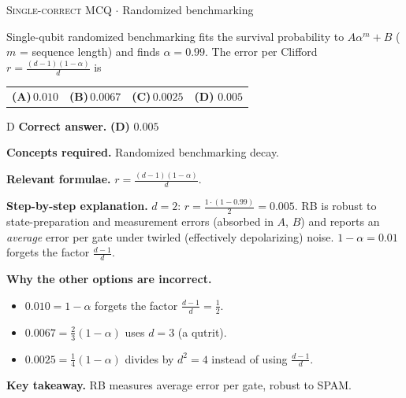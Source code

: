 \documentclass[11pt,a4paper]{article}
\newcommand{\optlabel}[1]{\textbf{(#1)}}
\newcommand{\correctlabel}[1]{\textcolor{okgreen}{\textbf{(#1)}\,\ding{51}}}
\newenvironment{qitem}[1]{\begin{list}{}{\setlength{\leftmargin}{3.3em}\setlength{\labelwidth}{3.1em}%
  \setlength{\labelsep}{0.2em}\setlength{\topsep}{3pt}\setlength{\parsep}{3pt}}\item[\textbf{Q.#1}\hfill]}{\end{list}}
\newcommand{\qsep}{\par\vspace{2pt}{\color{black!15}\hrule}\vspace{4pt}}
\newcommand{\qmeta}[2]{{\footnotesize\color{black!60}\textsc{#1} \;$\cdot$\; #2}\par}
\begin{document}
\begin{qitem}{62}
\qmeta{Single-correct MCQ}{Randomized benchmarking}
Single-qubit randomized benchmarking fits the survival probability to $A\alpha^m + B$ ($m$ = sequence length) and finds $\alpha = 0.99$. The error per Clifford
$r = \frac{(d - 1)(1 - \alpha)}{d}$ is
\par\smallskip\noindent\begin{tabularx}{\linewidth}{@{}*{4}{L}@{}}
\optlabel{A}\,$0.010$ & \optlabel{B}\,$0.0067$ & \optlabel{C}\,$0.0025$ & \correctlabel{D}\,$0.005$
\end{tabularx}
\end{qitem}
\begin{solbox}{D}
\textbf{\color{brand}Correct answer.} \textcolor{okgreen}{\textbf{(D)}} $0.005$

\textbf{\color{brand}Concepts required.} Randomized benchmarking decay.

\textbf{\color{brand}Relevant formulae.} $r = \frac{(d-1)(1-\alpha)}{d}$.

\textbf{\color{brand}Step-by-step explanation.} $d = 2$: $r = \frac{1\cdot(1 - 0.99)}{2} = 0.005$. RB is robust to state-preparation and measurement errors (absorbed in $A$, $B$) and reports an
\emph{average} error per gate under twirled (effectively depolarizing) noise. $1 - \alpha = 0.01$ forgets the factor $\frac{d-1}{d}$.

\textbf{\color{brand}Why the other options are incorrect.}
\begin{itemize}[leftmargin=2.4em, itemsep=1pt, topsep=2pt]
\item[\textbf{(A)}] $0.010 = 1 - \alpha$ forgets the factor $\frac{d-1}{d} = \frac12$.
\item[\textbf{(B)}] $0.0067 = \frac23(1 - \alpha)$ uses $d = 3$ (a qutrit).
\item[\textbf{(C)}] $0.0025 = \frac14(1-\alpha)$ divides by $d^2 = 4$ instead of using $\frac{d-1}{d}$.
\end{itemize}
\textbf{\color{brand}Key takeaway.} RB measures average error per gate, robust to SPAM.
\end{solbox}
\qsep
\end{document}
